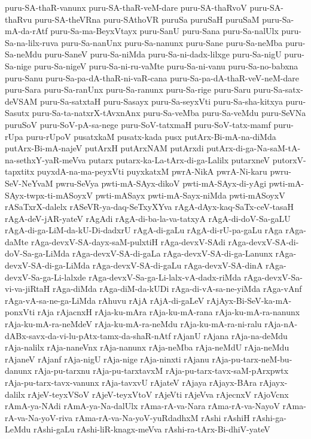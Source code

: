 {puru-SA-thaR-vanunx
puru-SA-thaR-veM-dare
puru-SA-thaRvoV
puru-SA-thaRvu
puru-SA-theVRna
puru-SAthoVR
puruSa
puruSaH
puruSaM
puru-Sa-mA-da-rAtf
puru-Sa-ma-BeyxVtayx
puru-SanU
puru-Sana
puru-Sa-nalUlx
puru-Sa-na-lilx-ruva
puru-Sa-nanUnx
puru-Sa-nanunx
puru-Sane
puru-Sa-neMba
puru-Sa-neMdu
puru-SaneV
puru-Sa-niMda
puru-Sa-ni-dadx-lilxge
puru-Sa-nigU
puru-Sa-nige
puru-Sa-nigeV
puru-Sa-ni-ru-vaMte
puru-Sa-ni-vanu
puru-Sa-no-babxna
puru-Sanu
puru-Sa-pa-dA-thaR-ni-vaR-cana
puru-Sa-pa-dA-thaR-veV-neM-dare
puru-Sara
puru-Sa-ranUnx
puru-Sa-ranunx
puru-Sa-rige
puru-Saru
puru-Sa-satx-deVSAM
puru-Sa-satxtaH
puru-Sasayx
puru-Sa-seyxVti
puru-Sa-sha-kitxya
puru-Sasutx
puru-Sa-ta-natxrX-tAvxnAnx
puru-Sa-veMba
puru-Sa-veMdu
puru-SeVNa
puruSoV
puru-SoV-pA-sa-nege
puru-SoV-tatxmaH
puru-SoV-tatx-mamf
puru-rUpa
puru-rUpoV
pusatxkaM
pusatx-kada
pusx
putArx-Bi-mA-na-diMda
putArx-Bi-mA-najeV
putArxH
putArxNAM
putArxdi
putArx-di-ga-Na-saM-tA-na-sethxY-yaR-meVva
putarx
putarx-ka-La-tArx-di-ga-Lalilx
putarxneV
putorxV-tapxtitx
puyxdA-na-ma-peyxVti
puyxkatxM
pwrA-NikA
pwrA-Ni-karu
pwru-SeV-NeYvaM
pwru-SeVya
pwti-mA-SAyx-dikoV
pwti-mA-SAyx-di-yAgi
pwti-mA-SAyx-twpx-ti-mASoyxV
pwti-mASayx
pwti-mA-Sayx-niMda
pwti-mASoyxV
rASaTxrX-dalelx
rASeVR-ya-daq-SeTxyXYva
rAgA-dAyx-kaq-SaTx-ceV-tasaH
rAgA-deV-jAR-yateV
rAgAdi
rAgA-di-ba-la-va-tatxyA
rAgA-di-doV-Sa-gaLU
rAgA-di-ga-LiM-da-kU-Di-dadxrU
rAgA-di-gaLu
rAgA-di-rU-pa-gaLu
rAga
rAga-daMte
rAga-devxV-SA-dayx-saM-pulxtiH
rAga-devxV-SAdi
rAga-devxV-SA-di-doV-Sa-ga-LiMda
rAga-devxV-SA-di-gaLa
rAga-devxV-SA-di-ga-Lanunx
rAga-devxV-SA-di-ga-LiMda
rAga-devxV-SA-di-gaLu
rAga-devxV-SA-dinA
rAga-devxV-Sa-ga-Li-lalxde
rAga-devxV-Sa-ga-Li-lalx-vA-dadx-riMda
rAga-devxV-Sa-vi-va-jiRtaH
rAga-diMda
rAga-diM-da-kUDi
rAga-di-vA-sa-ne-yiMda
rAga-vAnf
rAga-vA-sa-ne-ga-LiMda
rAhuvu
rAjA
rAjA-di-gaLeV
rAjAyx-Bi-SeV-ka-mA-ponxVti
rAja
rAjacnxH
rAja-ku-mAra
rAja-ku-mA-rana
rAja-ku-mA-ra-nanunx
rAja-ku-mA-ra-neMdeV
rAja-ku-mA-ra-neMdu
rAja-ku-mA-ra-ni-ralu
rAja-nA-dABx-savx-da-vi-lu-pAtx-tamx-da-shaR-nAtf
rAjanU
rAjana
rAja-na-deMdu
rAja-nalilx
rAja-naneVnx
rAja-nanunx
rAja-neMba
rAja-neMdU
rAja-neMdu
rAjaneV
rAjanf
rAja-nigU
rAja-nige
rAja-ninxti
rAjanu
rAja-pu-tarx-neM-bu-danunx
rAja-pu-tarxnu
rAja-pu-tarxtavxM
rAja-pu-tarx-tavx-saM-pArxpwtx
rAja-pu-tarx-tavx-vanunx
rAja-tavxvU
rAjateV
rAjaya
rAjayx-BAra
rAjayx-dalilx
rAjeV-teyxVSoV
rAjeV-teyxVtoV
rAjeVti
rAjeVva
rAjecnxV
rAjoVcnx
rAmA-ya-NAdi
rAmA-ya-Na-dalUlx
rAma-rA-va-Nara
rAma-rA-va-NayoV
rAma-rA-va-Na-yoV-riva
rAma-rA-va-Na-yoV-yuRdadhxM
rAshi
rAshiH
rAshi-ga-LeMdu
rAshi-gaLu
rAshi-liR-knagx-meVva
rAshi-ra-tArx-Bi-dhiV-yateV
}
